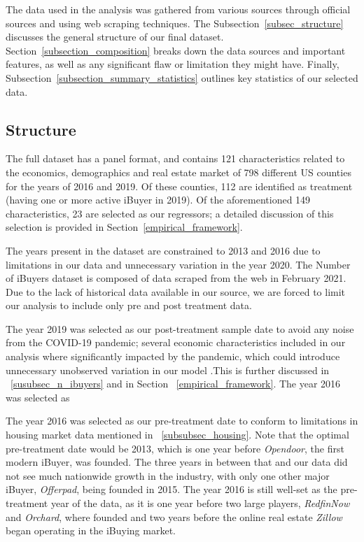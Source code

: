 The data used in the analysis was gathered from various sources through official sources and using web scraping techniques. The Subsection~\ref{subsec_structure} discusses the general structure of our final dataset. Section~\ref{subsection_composition} breaks down the data sources and important features, as well as any significant flaw or limitation they might have. Finally, Subsection~\ref{subsection_summary_statistics} outlines key statistics of our selected data. 

\subsection{Structure}\label{subsection_structure}
The full dataset has a panel format, and contains 121 characteristics related to the economics, demographics and real estate market of 798 different US counties for the years of 2016 and 2019. Of these counties, 112 are identified as treatment (having one or more active iBuyer in 2019). Of the aforementioned 149 characteristics, 23 are selected as our regressors; a detailed discussion of this selection is provided in Section~\ref{empirical_framework}.

The years present in the dataset are constrained to 2013 and 2016 due to limitations in our data and unnecessary variation in the year 2020. The Number of iBuyers dataset is composed of data scraped from the web in February 2021. Due to the lack of historical data available in our source, we are forced to limit our analysis to include only pre and post treatment data. 

The year 2019 was selected as our post-treatment sample date to avoid any noise from the COVID-19 pandemic; several economic characteristics included in our analysis where significantly impacted by the pandemic, which could introduce unnecessary unobserved variation in our model .This is further discussed in ~\ref{susubsec_n_ibuyers} and in Section ~\ref{empirical_framework}. The year 2016 was selected as 

The year 2016 was selected as our pre-treatment date to conform to limitations in housing market data mentioned in ~\ref{subsubsec_housing}. Note that the optimal pre-treatment date would be 2013, which is one year before \textit{Opendoor}, the first modern iBuyer, was founded. The three years in between that and our data did not see much nationwide growth in the industry, with only one other major iBuyer, \textit{Offerpad}, being founded in 2015. The year 2016 is still well-set as the pre-treatment year of the data, as it is one year before two large players, \textit{RedfinNow} and \textit{Orchard}, where founded and two years before the online real estate \textit{Zillow} began operating in the iBuying market.

